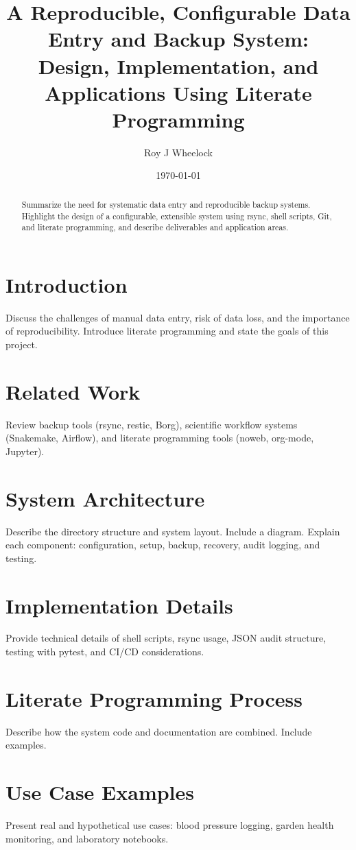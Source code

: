 \documentclass[12pt]{article}
\title{A Reproducible, Configurable Data Entry and Backup System:\\
Design, Implementation, and Applications Using Literate Programming}
\author{Roy J Wheelock}
\date{\today}
\begin{document}
\maketitle

\begin{abstract}
Summarize the need for systematic data entry and reproducible backup systems. Highlight the design of a configurable, extensible system using rsync, shell scripts, Git, and literate programming, and describe deliverables and application areas.
\end{abstract}

\section{Introduction}
Discuss the challenges of manual data entry, risk of data loss, and the importance of reproducibility. Introduce literate programming and state the goals of this project.

\section{Related Work}
Review backup tools (rsync, restic, Borg), scientific workflow systems (Snakemake, Airflow), and literate programming tools (noweb, org-mode, Jupyter).

\section{System Architecture}
Describe the directory structure and system layout. Include a diagram. Explain each component: configuration, setup, backup, recovery, audit logging, and testing.

\section{Implementation Details}
Provide technical details of shell scripts, rsync usage, JSON audit structure, testing with pytest, and CI/CD considerations.

\section{Literate Programming Process}
Describe how the system code and documentation are combined. Include examples.

\section{Use Case Examples}
Present real and hypothetical use cases: blood pressure logging, garden health monitoring, and laboratory notebooks.
\end{document}
